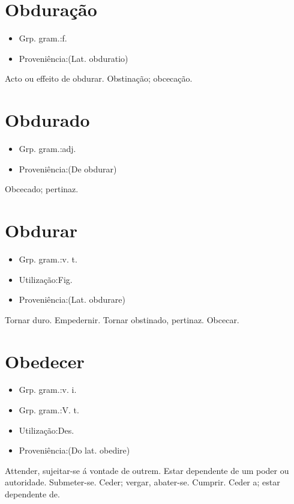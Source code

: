 \section{Obduração}
\begin{itemize}
\item {Grp. gram.:f.}
\end{itemize}
\begin{itemize}
\item {Proveniência:(Lat. \textunderscore obduratio\textunderscore )}
\end{itemize}
Acto ou effeito de obdurar.
Obstinação; obcecação.
\section{Obdurado}
\begin{itemize}
\item {Grp. gram.:adj.}
\end{itemize}
\begin{itemize}
\item {Proveniência:(De \textunderscore obdurar\textunderscore )}
\end{itemize}
Obcecado; pertinaz.
\section{Obdurar}
\begin{itemize}
\item {Grp. gram.:v. t.}
\end{itemize}
\begin{itemize}
\item {Utilização:Fig.}
\end{itemize}
\begin{itemize}
\item {Proveniência:(Lat. \textunderscore obdurare\textunderscore )}
\end{itemize}
Tornar duro.
Empedernir.
Tornar obstinado, pertinaz.
Obcecar.
\section{Obedecer}
\begin{itemize}
\item {Grp. gram.:v. i.}
\end{itemize}
\begin{itemize}
\item {Grp. gram.:V. t.}
\end{itemize}
\begin{itemize}
\item {Utilização:Des.}
\end{itemize}
\begin{itemize}
\item {Proveniência:(Do lat. \textunderscore obedire\textunderscore )}
\end{itemize}
Attender, sujeitar-se á vontade de outrem.
Estar dependente de um poder ou autoridade.
Submeter-se.
Ceder; vergar, abater-se.
Cumprir.
Ceder a; estar dependente de.
